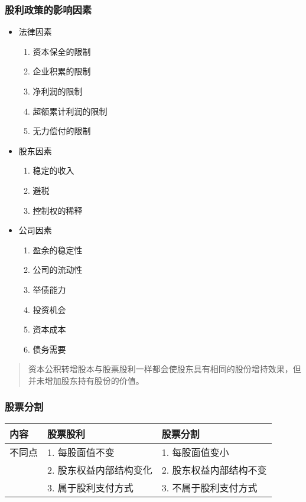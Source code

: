 \documentclass[11pt]{article}
\begin{document}
\subsubsection{股利政策的影响因素}
\label{sec:orgc0b8ab5}
\begin{itemize}
\item 法律因素
\begin{enumerate}
\item 资本保全的限制
\item 企业积累的限制
\item 净利润的限制
\item 超额累计利润的限制
\item 无力偿付的限制
\end{enumerate}
\item 股东因素
\begin{enumerate}
\item 稳定的收入
\item 避税
\item 控制权的稀释
\end{enumerate}
\item 公司因素
\begin{enumerate}
\item 盈余的稳定性
\item 公司的流动性
\item 举债能力
\item 投资机会
\item 资本成本
\item 债务需要
\end{enumerate}
\end{itemize}
\begin{quote}
资本公积转增股本与股票股利一样都会使股东具有相同的股份增持效果，但并未增加股东持有股份的价值。
\end{quote}

\subsubsection{股票分割}
\label{sec:orge23aa53}
\begin{center}
\begin{tabular}{lll}
内容 & 股票股利 & 股票分割\\
\hline
不同点 & 1. 每股面值不变 & 1. 每股面值变小\\
 & 2. 股东权益内部结构变化 & 2. 股东权益内部结构不变\\
 & 3. 属于股利支付方式 & 3. 不属于股利支付方式\\
\end{tabular}
\end{center}
\end{document}
